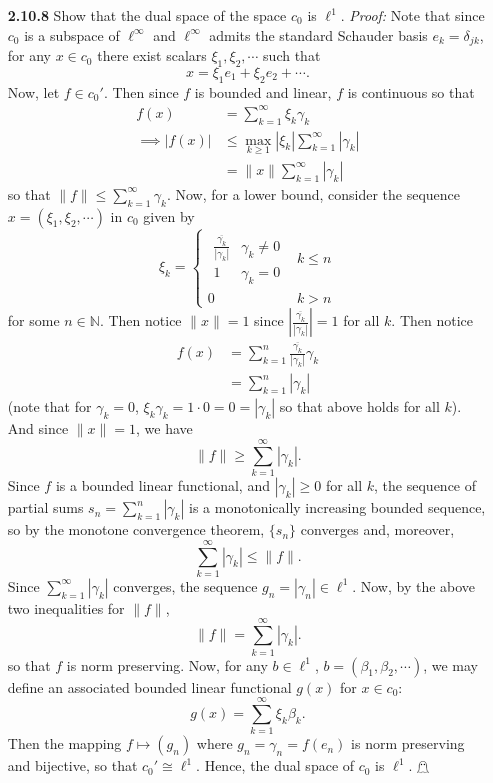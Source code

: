 \documentclass{article}
\begin{document}
\begin{itemize}
    \item[\textbf{2.10.8}] Show that the dual space of the space $c_0$ is $\ell^1$. 
    \newline\newline
    \textit{Proof:} Note that since $c_0$ is a subspace of $\ell^{\infty}$ and $\ell^{\infty}$ admits the standard Schauder basis $e_k  = \delta_{jk}$, for any $x \in c_0$ there exist scalars $\xi_1, \xi_2, \cdots$ such that 
    \[x = \xi_1e_1 + \xi_2e_2 + \cdots.\]
    Now, let $f \in c_0'$. Then since $f$ is bounded and linear, $f$ is continuous so that
    \begin{align*}
        f(x) &= \sum_{k = 1}^{\infty} \xi_k\gamma_k \tag{$\gamma_k = f(e_k)$}\\
        \implies |f(x)| &\leq \max_{k \geq 1}|\xi_k| \sum_{k=1}^{\infty} |\gamma_k|\\
        &= \|x\| \sum_{k = 1}^{\infty} |\gamma_k|
    \end{align*}
    so that $\|f\| \leq \sum_{k = 1}^{\infty} \gamma_k$. Now, for a lower bound, consider the sequence $x = (\xi_1, \xi_2, \cdots)$ in $c_0$ given by
    \[\xi_k = \begin{cases}
    \begin{matrix}
        \frac{\overline{\gamma_k}}{|\gamma_k|} & \gamma_k \neq 0\\
        1 & \gamma_k = 0
    \end{matrix} & k \leq n\\
    0 & k > n
    \end{cases}\]
    for some $n \in \mathbb{N}$. Then notice $\|x\| = 1$ since $\left|\tfrac{\overline{\gamma_k}}{|\gamma_k|}\right| = 1$ for all $k$. Then notice
    \begin{align*}
        f(x) &= \sum_{k = 1}^{n} \frac{\overline{\gamma_k}}{|\gamma_k|}\gamma_k\\
        &= \sum_{k = 1}^{n} |\gamma_k|
     \end{align*}
    (note that for $\gamma_k = 0$, $\xi_k\gamma_k = 1\cdot 0 = 0 = |\gamma_k|$ so that above holds for all $k$). And since $\|x\| = 1$, we have
    \[\|f\| \geq \sum_{k = 1}^{\infty} |\gamma_k|.\]
    Since $f$ is a bounded linear functional, and $|\gamma_k| \geq 0$ for all $k$, the sequence of partial sums $s_n = \sum_{k = 1}^n |\gamma_k|$ is a monotonically increasing bounded sequence, so by the monotone convergence theorem, $\{s_n\}$ converges and, moreover,
    \[\sum_{k = 1}^{\infty} |\gamma_k| \leq \|f\|.\]
    Since $\sum_{k = 1}^{\infty} |\gamma_k|$ converges, the sequence $g_n = |\gamma_n| \in \ell^1$. Now, by the above two inequalities for $\|f\|$, 
    \[\|f\| = \sum_{k = 1}^{\infty} |\gamma_k|.\]
    so that $f$ is norm preserving.
    Now, for any $b \in \ell^1$, $b = (\beta_1, \beta_2, \cdots)$, we may define an associated bounded linear functional $g(x)$ for $x \in c_0$:
    \[g(x) = \sum_{k = 1}^{\infty} \xi_k\beta_k.\]
    Then the mapping $f \mapsto (g_n)$ where $g_n = \gamma_n = f(e_n)$ is norm preserving and bijective, so that $c_0' \cong \ell^1$. Hence,
    the dual space of $c_0$ is $\ell^1$. \hfill $\mathghost$
\end{itemize}
\end{document}
